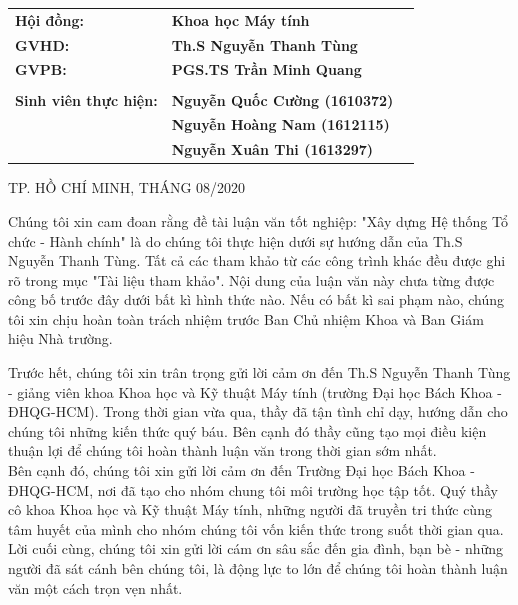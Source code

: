 \documentclass[12pt, a4paper]{report}
\begin{document}
\begin{titlepage}
\vspace{1cm}
\begin{table}[h!]
    \fontsize{15pt}{1}
    \centering
    \begin{tabular}{lll}
        \textbf{Hội đồng:} & \textbf{Khoa học Máy tính}\\
        \textbf{GVHD:} & \textbf{Th.S Nguyễn Thanh Tùng}\\
        \textbf{GVPB:} & \textbf{PGS.TS Trần Minh Quang}\\
\\
        \textbf{Sinh viên thực hiện:} & \textbf{Nguyễn Quốc Cường (1610372)}\\
        & \textbf{Nguyễn Hoàng Nam (1612115)}\\
        & \textbf{Nguyễn Xuân Thi (1613297)}\\
    \end{tabular}
\end{table}
\vspace{1.5cm}
\begin{center}
{\footnotesize TP. HỒ CHÍ MINH, THÁNG 08/2020}
\end{center}
\end{titlepage}
\begin{declaration}
Chúng tôi xin cam đoan rằng đề tài luận văn tốt nghiệp: "Xây dựng Hệ thống Tổ chức - Hành chính" là do chúng tôi thực hiện dưới sự hướng dẫn của Th.S Nguyễn Thanh Tùng. Tất cả các tham khảo từ các công trình khác đều được ghi rõ trong mục "Tài liệu tham khảo". Nội dung của luận văn này chưa từng được công bố trước đây dưới bất kì hình thức nào. Nếu có bất kì sai phạm nào, chúng tôi xin chịu hoàn toàn trách nhiệm trước Ban Chủ nhiệm Khoa và Ban Giám hiệu Nhà trường.
\newline
{}
\end{declaration}
\newpage
\begin{thankyou}
Trước hết, chúng tôi xin trân trọng gửi lời cảm ơn đến Th.S Nguyễn Thanh Tùng - giảng viên khoa Khoa học và Kỹ thuật Máy tính (trường Đại học Bách Khoa - ĐHQG-HCM). Trong thời gian vừa qua, thầy đã tận tình chỉ dạy, hướng dẫn cho chúng tôi những kiến thức quý báu. Bên cạnh đó thầy cũng tạo mọi điều kiện thuận lợi để chúng tôi hoàn thành luận văn trong thời gian sớm nhất.\\
\indent Bên cạnh đó, chúng tôi xin gửi lời cảm ơn đến Trường Đại học Bách Khoa - ĐHQG-HCM, nơi đã tạo cho nhóm chung tôi môi trường học tập tốt. Quý thầy cô khoa Khoa học và Kỹ thuật Máy tính, những người đã truyền tri thức cùng tâm huyết của mình cho nhóm chúng tôi vốn kiến thức trong suốt thời gian qua.\\
\indent Lời cuối cùng, chúng tôi xin gửi lời cám ơn sâu sắc đến gia đình, bạn bè - những người đã sát cánh bên chúng tôi, là động lực to lớn để chúng tôi hoàn thành luận văn một cách trọn vẹn nhất.
\newline
{}
\end{thankyou}
\end{document}
